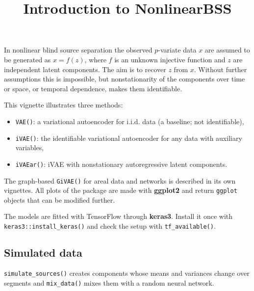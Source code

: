 \documentclass[
]{article}
\title{Introduction to NonlinearBSS}
\author{}
\date{\vspace{-2.5em}}
\newenvironment{Shaded}{\begin{snugshade}}{\end{snugshade}}
\newcommand{\AttributeTok}[1]{\textcolor[rgb]{0.13,0.29,0.53}{#1}}
\newcommand{\DecValTok}[1]{\textcolor[rgb]{0.00,0.00,0.81}{#1}}
\newcommand{\FunctionTok}[1]{\textcolor[rgb]{0.13,0.29,0.53}{\textbf{#1}}}
\newcommand{\NormalTok}[1]{#1}
\newcommand{\OtherTok}[1]{\textcolor[rgb]{0.56,0.35,0.01}{#1}}
\newcommand{\SpecialCharTok}[1]{\textcolor[rgb]{0.81,0.36,0.00}{\textbf{#1}}}
\providecommand{\tightlist}{%
  \setlength{\itemsep}{0pt}\setlength{\parskip}{0pt}}
\begin{document}
\maketitle

In nonlinear blind source separation the observed \(p\)-variate data
\(x\) are assumed to be generated as \(x = f(z)\), where \(f\) is an
unknown injective function and \(z\) are independent latent components.
The aim is to recover \(z\) from \(x\). Without further assumptions this
is impossible, but nonstationarity of the components over time or space,
or temporal dependence, makes them identifiable.

This vignette illustrates three methods:

\begin{itemize}
\tightlist
\item
  \texttt{VAE()}: a variational autoencoder for i.i.d. data (a baseline;
  not identifiable),
\item
  \texttt{iVAE()}: the identifiable variational autoencoder for any data
  with auxiliary variables,
\item
  \texttt{iVAEar()}: iVAE with nonstationary autoregressive latent
  components.
\end{itemize}

The graph-based \texttt{GiVAE()} for areal data and networks is
described in its own vignettes. All plots of the package are made with
\textbf{ggplot2} and return \texttt{ggplot} objects that can be modified
further.

The models are fitted with TensorFlow through \textbf{keras3}. Install
it once with \texttt{keras3::install\_keras()} and check the setup with
\texttt{tf\_available()}.

\subsection{Simulated data}\label{simulated-data}

\texttt{simulate\_sources()} creates components whose means and
variances change over segments and \texttt{mix\_data()} mixes them with
a random neural network.

\begin{Shaded}
\end{Shaded}
\end{document}
